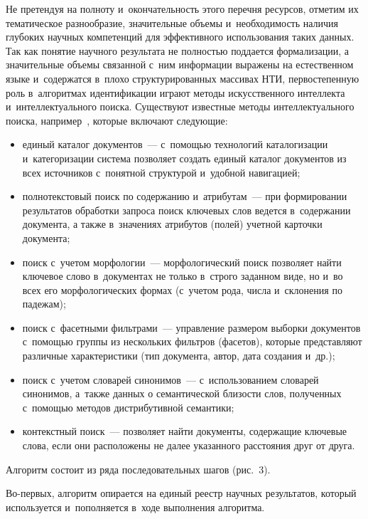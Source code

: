\begin{multicols}{2}
    Не претендуя на полноту и~окончательность этого перечня ресурсов, 
отметим их тематическое разнообразие, значительные объемы 
и~необходимость наличия глубоких научных компетенций для эффективного 
использования таких данных. Так как понятие научного результата не 
полностью поддается формализации, а значительные объемы связанной 
с~ним информации выражены на естественном языке и~содержатся в~плохо 
структурированных массивах НТИ, первостепенную роль в~алгоритмах 
идентификации играют методы искусственного интеллекта 
и~интеллектуального поиска. Существуют известные методы 
интеллектуального поиска, например~\cite{8-su}, которые включают 
следующие:
    \begin{itemize}
    \item единый каталог документов~--- с~помощью технологий 
каталогизации и~категоризации система позволяет создать единый каталог 
документов из всех источников с~понятной структурой и~удобной 
навигацией;
      \item полнотекстовый поиск по содержанию и~атрибутам~--- при 
формировании результатов обработки запроса поиск ключевых слов ведется в~содержании документа, а также в~значениях атрибутов (полей) учетной 
карточки документа; 
          \item  поиск с~учетом морфологии~--- морфологический поиск позволяет 
найти ключевое слово в~документах не только в~строго заданном виде, но 
и~во всех его морфологических формах (с~учетом рода, числа и~склонения 
по падежам); 
         \item  поиск с~фасетными фильтрами~--- управление размером выборки 
документов с~помощью группы из нескольких фильтров (фасетов), которые 
представляют различные характеристики (тип документа, автор, дата 
создания и~др.); 
          \item  поиск с~учетом словарей синонимов~--- с~использованием словарей 
синонимов, а~также данных о семантической близости слов, полученных 
с~помощью методов дистрибутивной семантики; 
          \item  контекстный поиск~--- позволяет найти документы, содержащие 
ключевые слова, если они расположены не далее указанного расстояния друг 
от друга. 
\end{itemize}

    Алгоритм состоит из ряда последовательных шагов (рис.~3). 
    
    Во-первых, алгоритм опирается на единый реестр научных результатов, 
который используется и~пополняется в~ходе выполнения алгоритма. 
    

\end{multicols}

